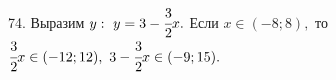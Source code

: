 74. Выразим $y:\ y=3-\cfrac{3}{2}x.$ Если $x\in(-8;8),$ то $\cfrac{3}{2}x\in (-12;12),\ 3-\cfrac{3}{2}x\in (-9;15).$\\
